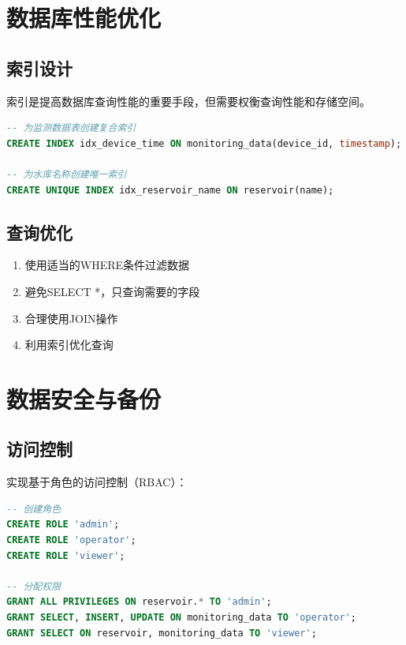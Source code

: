 \section{数据库性能优化}

\subsection{索引设计}

索引是提高数据库查询性能的重要手段，但需要权衡查询性能和存储空间。

\begin{lstlisting}[language=SQL, caption=索引创建示例]
-- 为监测数据表创建复合索引
CREATE INDEX idx_device_time ON monitoring_data(device_id, timestamp);

-- 为水库名称创建唯一索引
CREATE UNIQUE INDEX idx_reservoir_name ON reservoir(name);
\end{lstlisting}

\subsection{查询优化}

\begin{enumerate}
    \item 使用适当的WHERE条件过滤数据
    \item 避免SELECT *，只查询需要的字段
    \item 合理使用JOIN操作
    \item 利用索引优化查询
\end{enumerate}

\section{数据安全与备份}

\subsection{访问控制}

实现基于角色的访问控制（RBAC）：

\begin{lstlisting}[language=SQL, caption=权限控制示例]
-- 创建角色
CREATE ROLE 'admin';
CREATE ROLE 'operator';
CREATE ROLE 'viewer';

-- 分配权限
GRANT ALL PRIVILEGES ON reservoir.* TO 'admin';
GRANT SELECT, INSERT, UPDATE ON monitoring_data TO 'operator';
GRANT SELECT ON reservoir, monitoring_data TO 'viewer';
\end{lstlisting}

